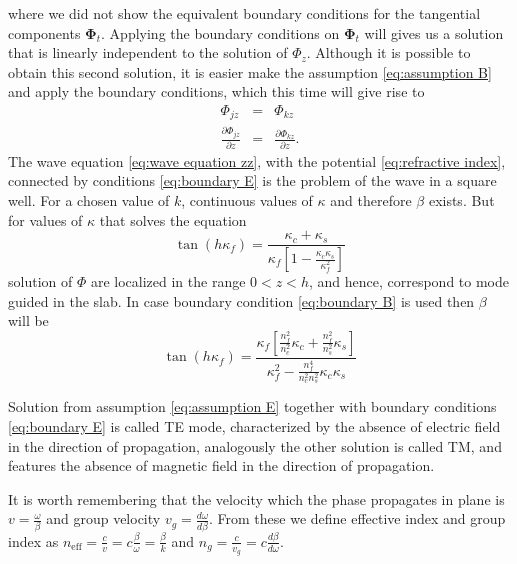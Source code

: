 \documentclass[12pt,twoside,english]{book}
\renewcommand{\~}{\perispomeni}%
\numberwithin{equation}{section}
\numberwithin{figure}{section}
\begin{document}
where we did not show the equivalent boundary conditions for the tangential components $\mathbf{\Phi}_{t}$. Applying the boundary conditions on $\mathbf{\Phi}_{t}$ will gives us a solution that is linearly independent to the solution of $\Phi_{z}$. Although it is possible to obtain this second solution, it is easier make the assumption \ref{eq:assumption B} and apply the boundary conditions, which this time will give rise to
\begin{subequations}
\begin{eqnarray}
\Phi_{jz} & = & \Phi_{kz}\label{eq:boundary Bz}\\
\frac{\partial\Phi_{jz}}{\partial z} & = & \frac{\partial\Phi_{kz}}{\partial z}.\label{eq:boundary dBz}\end{eqnarray}
\label{eq:boundary B}\end{subequations}
The wave equation \ref{eq:wave equation zz}, with the potential \ref{eq:refractive index}, connected by conditions \ref{eq:boundary E} is the problem of the wave in a square well. For a chosen value of $k$, continuous values of $\kappa$ and therefore $\beta$ exists. But for values of $\kappa$ that solves the equation
\begin{equation}
\tan\left(h\kappa_{f}\right)=\frac{\kappa_{c}+\kappa_{s}}{\kappa_{f}\left[1-\frac{\kappa_{c}\kappa_{s}}{\kappa_{f}^{2}}\right]}
\label{eq:TE transcedental}
\end{equation}
solution of $\Phi$ are localized in the range $0<z<h$, and hence, correspond to mode guided in the slab. In case boundary condition \ref{eq:boundary B} is used then $\beta$ will be
\begin{equation}
\tan\left(h\kappa_{f}\right)=\frac{\kappa_{f}\left[\frac{n_{f}^{2}}{n_{c}^{2}}\kappa_{c}+\frac{n_{f}^{2}}{n_{s}^{2}}\kappa_{s}\right]}{\kappa_{f}^{2}-\frac{n_{f}^{4}}{n_{c}^{2}n_{s}^{2}}\kappa_{c}\kappa_{s}}
\label{eq:TM transcedental}
\end{equation}

Solution from assumption \ref{eq:assumption E} together with boundary conditions \ref{eq:boundary E} is called \gls{TE} mode, characterized by the absence of electric field in the direction of propagation, analogously the other solution is called \gls{TM}, and features the absence of magnetic field in the direction of propagation.


It is worth remembering that the velocity which the phase propagates in plane is $v=\frac{\omega}{\beta}$ and group velocity $v_{g}=\frac{d\omega}{d\beta}$. From these we define effective index and group index as $n_{\mbox{eff}}=\frac{c}{v}=c\frac{\beta}{\omega}=\frac{\beta}{k}$ and $n_{g}=\frac{c}{v_{g}}=c\frac{d\beta}{d\omega}$.
\end{document}
